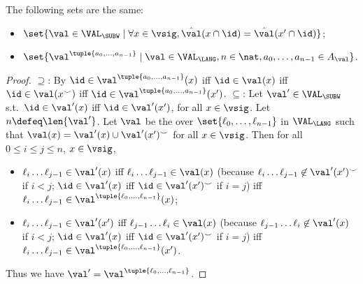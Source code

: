 \begin{lemma}\label{lemma: subw surjective reverse}
    The following sets are the same:
    \begin{itemize}
        \item $\set{\val \in \VAL_{\SUBW} \mid \forall x \in \vsig, \hat{\val}(x \cap \id) = \hat{\val}(x' \cap \id)}$;
        \item $\set{\val^{\tuple{a_0, \dots, a_{n-1}}} \mid \val \in \VAL_{\LANG}, n \in \nat, a_0, \dots, a_{n-1} \in A_{\val}}$.
    \end{itemize}
\end{lemma}
\begin{proof}
    $\supseteq$:
    By $\id \in \val^{\tuple{a_0, \dots, a_{n-1}}}(x)$ iff $\id \in \val(x)$ iff $\id \in \val(x^{\smile})$ iff $\id \in \val^{\tuple{a_0, \dots, a_{n-1}}}(x')$.
    $\subseteq$:
    Let $\val' \in \VAL_{\SUBW}$ s.t.\ $\id \in \val'(x)$ iff $\id \in \val'(x')$, for all $x \in \vsig$.
    Let $n \defeq \len{\val'}$.
    Let $\val$ be the  over $\set{\ell_0, \dots, \ell_{n-1}}$ in $\VAL_{\LANG}$ such that
    $\val(x) = \val'(x) \cup \val'(x')^{\smile}$ for all $x \in \vsig$.
    Then for all $0 \le i \le j \le n$, $x \in \vsig$,
    \begin{itemize}
        \item $\ell_{i} \dots \ell_{j-1} \in \val'(x)$ iff $\ell_{i} \dots \ell_{j-1} \in \val(x)$ (because $\ell_{i} \dots \ell_{j-1} \not\in \val'(x')^{\smile}$ if $i < j$; $\id \in \val'(x)$ iff $\id \in \val'(x')^{\smile}$ if $i = j$) iff $\ell_{i} \dots \ell_{j-1} \in \val^{\tuple{\ell_{0}, \dots, \ell_{n-1}}}(x)$;
        \item $\ell_{i} \dots \ell_{j-1} \in \val'(x')$ iff $\ell_{j-1} \dots \ell_{i} \in \val(x)$ (because $\ell_{j-1} \dots \ell_{i} \not\in \val'(x)$ if $i < j$; $\id \in \val'(x)$ iff $\id \in \val'(x')^{\smile}$ if $i = j$) iff $\ell_{i} \dots \ell_{j-1} \in \val^{\tuple{\ell_{0}, \dots, \ell_{n-1}}}(x')$.
    \end{itemize}
    Thus we have $\val' = \val^{\tuple{\ell_{0}, \dots, \ell_{n-1}}}$.
\end{proof}

